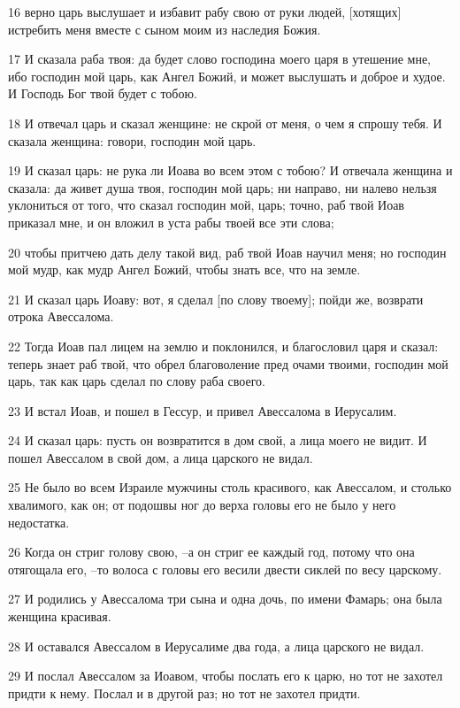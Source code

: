 \par 16 верно царь выслушает и избавит рабу свою от руки людей, [хотящих] истребить меня вместе с сыном моим из наследия Божия.
\par 17 И сказала раба твоя: да будет слово господина моего царя в утешение мне, ибо господин мой царь, как Ангел Божий, и может выслушать и доброе и худое. И Господь Бог твой будет с тобою.
\par 18 И отвечал царь и сказал женщине: не скрой от меня, о чем я спрошу тебя. И сказала женщина: говори, господин мой царь.
\par 19 И сказал царь: не рука ли Иоава во всем этом с тобою? И отвечала женщина и сказала: да живет душа твоя, господин мой царь; ни направо, ни налево нельзя уклониться от того, что сказал господин мой, царь; точно, раб твой Иоав приказал мне, и он вложил в уста рабы твоей все эти слова;
\par 20 чтобы притчею дать делу такой вид, раб твой Иоав научил меня; но господин мой мудр, как мудр Ангел Божий, чтобы знать все, что на земле.
\par 21 И сказал царь Иоаву: вот, я сделал [по слову твоему]; пойди же, возврати отрока Авессалома.
\par 22 Тогда Иоав пал лицем на землю и поклонился, и благословил царя и сказал: теперь знает раб твой, что обрел благоволение пред очами твоими, господин мой царь, так как царь сделал по слову раба своего.
\par 23 И встал Иоав, и пошел в Гессур, и привел Авессалома в Иерусалим.
\par 24 И сказал царь: пусть он возвратится в дом свой, а лица моего не видит. И пошел Авессалом в свой дом, а лица царского не видал.
\par 25 Не было во всем Израиле мужчины столь красивого, как Авессалом, и столько хвалимого, как он; от подошвы ног до верха головы его не было у него недостатка.
\par 26 Когда он стриг голову свою, --а он стриг ее каждый год, потому что она отягощала его, --то волоса с головы его весили двести сиклей по весу царскому.
\par 27 И родились у Авессалома три сына и одна дочь, по имени Фамарь; она была женщина красивая.
\par 28 И оставался Авессалом в Иерусалиме два года, а лица царского не видал.
\par 29 И послал Авессалом за Иоавом, чтобы послать его к царю, но тот не захотел придти к нему. Послал и в другой раз; но тот не захотел придти.
